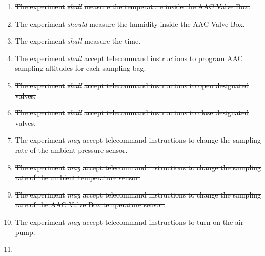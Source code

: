 \documentclass[a4paper,12pt,twoside]{article}
\providecommand{\DIFdeltex}[1]{{\protect\color{red}\sout{#1}}}                      %
\providecommand{\DIFdel}[1]{\texorpdfstring{\DIFdeltex{#1}}{}} %
\begin{document}
\begin{enumerate}
\item%
\DIFdel{The experiment }\textit{\DIFdel{shall}} %
\DIFdel{measure the temperature inside the AAC Valve Box.
    }%
\item%
\DIFdel{The experiment }\textit{\DIFdel{should}} %
\DIFdel{measure the humidity inside the AAC Valve Box.
    }%
\item%
\DIFdel{The experiment }\textit{\DIFdel{shall}} %
\DIFdel{measure the time.
    }%
\item%
\DIFdel{The experiment }\textit{\DIFdel{shall}} %
\DIFdel{accept telecommand instructions to program AAC sampling altitudes for each sampling bag.
    }%
\item%
\DIFdel{The experiment }\textit{\DIFdel{shall}} %
\DIFdel{accept telecommand instructions to open designated valves.
    }%
\item%
\DIFdel{The experiment }\textit{\DIFdel{shall}} %
\DIFdel{accept telecommand instructions to close designated valves.
    }%
\item%
\DIFdel{The experiment }\textit{\DIFdel{may}} %
\DIFdel{accept telecommand instructions to change the sampling rate of the ambient pressure sensor.
    }%
\item%
\DIFdel{The experiment }\textit{\DIFdel{may}} %
\DIFdel{accept telecommand instructions to change the sampling rate of the ambient temperature sensor.
    }%
\item%
\DIFdel{The experiment }\textit{\DIFdel{may}} %
\DIFdel{accept telecommand instructions to change the sampling rate of the AAC Valve Box temperature sensor.
    }%
\item%
\DIFdel{The experiment }\textit{\DIFdel{may}} %
\DIFdel{accept telecommand instructions to turn on the air pump.
    }%
\item%

\end{enumerate}
\end{document}
